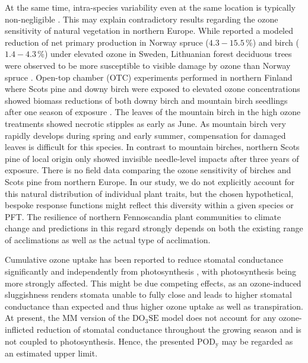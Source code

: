 \documentclass[bg, manuscript]{copernicus}
\begin{document}
At the same time, intra-species variability even at the same location is typically non-negligible \citep{EP:Bassin2004,Amb:Girgzdiene2009}. This may explain contradictory results regarding the ozone sensitivity of natural vegetation in northern Europe. While \citet{FS:Subramanian2014} reported a modeled reduction of net primary production in Norway spruce ($4.3-15.5\,\unit{\%}$) and birch ($1.4-4.3\,\unit{\%}$) under elevated ozone in Sweden, Lithuanian forest deciduous trees were observed to be more susceptible to visible damage by ozone than Norway spruce \citep{Amb:Girgzdiene2009}. Open-top chamber (OTC) experiments performed in northern Finland where Scots pine and downy birch were exposed to elevated ozone concentrations showed biomass reductions of both downy birch and mountain birch seedlings after one season of exposure \citep{Amb:Manninen2009}. The leaves of the mountain birch in the high ozone treatments showed necrotic stipples as early as June. As mountain birch very rapidly develops during spring and early summer, compensation for damaged leaves is difficult for this species. In contrast to mountain birches, northern Scots pine of local origin only showed invisible needle-level  impacts after three years of exposure. There is no field data comparing the ozone sensitivity of birches and Scots pine from northern Europe.
In our study, we do not explicitly account for this natural distribution of individual plant traits, but the chosen hypothetical, bespoke response functions might reflect this diversity within a given species or PFT. The resilience of northern Fennoscandia plant communities to climate change and predictions in this regard strongly depends on both the existing range of acclimations as well as the actual type of acclimation. 

Cumulative ozone uptake has been reported to reduce stomatal conductance significantly and independently from photosynthesis \citep[e.g.]{BGS:Lombardozzi2012}, with photosynthesis being more strongly affected. This might be due competing effects, as an ozone-induced sluggishness \citep{SR:Hoshika2015} renders stomata unable to fully close and leads to higher stomatal conductance than expected and thus higher ozone uptake as well as transpiration. At present, the MM version of the $\mathrm{DO_3SE}$ model does not account for any ozone-inflicted reduction of stomatal conductance throughout the growing season and is not coupled to photosynthesis. Hence, the presented $\mathrm{POD_y}$ may be regarded as an estimated upper limit.\\
\end{document}
